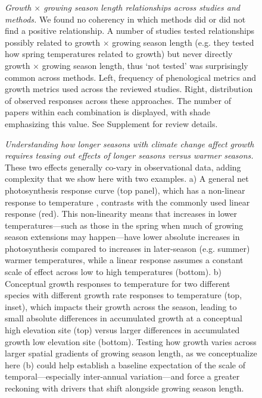 \documentclass[11pt]{article}
\begin{document}
\clearpage
\begin{figure}[h!]
\caption{\emph{Growth $\times$ growing season length relationships across studies and methods.} We found no coherency in which methods did or did not find a positive relationship. A number of studies tested relationships possibly related to growth $\times$ growing season length (e.g. they tested how spring temperatures related to growth) but never directly growth $\times$ growing season length, thus `not tested' was surprisingly common across methods. Left, frequency of phenological metrics and growth metrics used across the reviewed studies. Right, distribution of observed responses across these approaches. The number of papers within each combination is displayed, with shade emphasizing this value. See Supplement for review details.}
\end{figure}


\clearpage
\begin{figure}[h!]
\caption{\emph{Understanding how longer seasons with climate change affect growth requires teasing out effects of longer seasons versus warmer seasons.} These two effects generally co-vary in observational data, adding complexity that we show here with two examples. a) A general net photosynthesis response curve (top panel), which has a non-linear response to temperature  \citep[blue curve, adapted from meta-analysis of][]{rezende2019thermal}, contrasts with the commonly used linear response (red). This non-linearity means that increases in lower temperatures---such as those in the spring when much of growing season extensions may happen---have lower absolute increases in photosynthesis compared to increases in later-season (e.g. summer) warmer temperatures, while a linear response assumes a constant scale of effect across low to high temperatures (bottom). b) Conceptual growth responses to temperature for two different species with different growth rate responses to temperature (top, inset), which impacts their growth across the season, leading to small absolute differences in accumulated growth at a conceptual high elevation site (top) versus larger differences in accumulated growth low elevation site (bottom). Testing how growth varies across larger spatial gradients of growing season length, as we conceptualize here (b) could help establish a baseline expectation of the scale of temporal---especially inter-annual variation---and force a greater reckoning with drivers that shift alongside growing season length.}
\end{figure}
\end{document}
